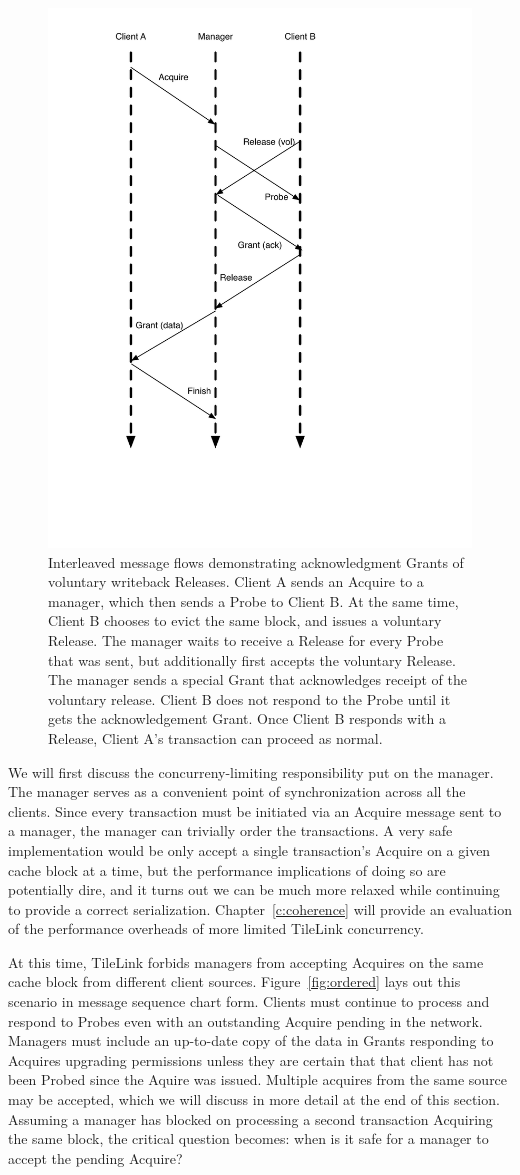 \begin{figure}[!p]
\centering
\includegraphics[width=0.5\columnwidth]{tilelink/figures/rel-merge.pdf}
\caption{Interleaved message flows demonstrating acknowledgment Grants of voluntary writeback Releases.
Client A sends an Acquire to a manager, which then sends a Probe to Client B.
At the same time, Client B chooses to evict the same block, and issues a voluntary Release.
The manager waits to receive a Release for every Probe that was sent, but additionally first accepts the voluntary Release.
The manager sends a special Grant that acknowledges receipt of the voluntary release.
Client B does not respond to the Probe until it gets the acknowledgement Grant.
Once Client B responds with a Release, Client A's transaction can proceed as normal.
}
\label{fig:rel-merge}
\end{figure}

We will first discuss the concurreny-limiting responsibility put on the manager.
The manager serves as a convenient point of synchronization across all the clients.
Since every transaction must be initiated via an Acquire message sent to a manager, the manager can trivially order the transactions.
A very safe implementation would be only accept a single transaction's Acquire on a given cache block at a time,
but the performance implications of doing so are potentially dire, and it turns out we can be much more relaxed while continuing to provide a correct serialization.
Chapter~\ref{c:coherence} will provide an evaluation of the performance overheads of more limited TileLink concurrency.

At this time, TileLink forbids managers from accepting Acquires on the same cache block from different client sources.
Figure~\ref{fig:ordered} lays out this scenario in message sequence chart form.
Clients must continue to process and respond to Probes even with an outstanding Acquire pending in the network.
Managers must include an up-to-date copy of the data in Grants responding to Acquires upgrading permissions unless they are certain that that
client has not been Probed since the Aquire was issued.
Multiple acquires from the same source may be accepted, which we will discuss in more detail at the end of this section.
Assuming a manager has blocked on processing a second transaction Acquiring the same block, the critical question becomes: when is it safe for a manager to accept the pending Acquire?


